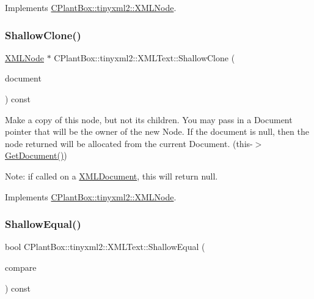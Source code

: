 Implements \hyperlink{classCPlantBox_1_1tinyxml2_1_1XMLNode_a2cdc6f044bd1f971e211328e42a4f9d5}{C\+Plant\+Box\+::tinyxml2\+::\+X\+M\+L\+Node}.

\mbox{\label{classCPlantBox_1_1tinyxml2_1_1XMLText_ac0dd7bbd05ed931505a5f214ee7c1fe8}} 
\subsubsection{\texorpdfstring{Shallow\+Clone()}{ShallowClone()}}
{\footnotesize\ttfamily \hyperlink{classCPlantBox_1_1tinyxml2_1_1XMLNode}{X\+M\+L\+Node} $\ast$ C\+Plant\+Box\+::tinyxml2\+::\+X\+M\+L\+Text\+::\+Shallow\+Clone (\begin{DoxyParamCaption}\item[{\hyperlink{classCPlantBox_1_1tinyxml2_1_1XMLDocument}{X\+M\+L\+Document} $\ast$}]{document }\end{DoxyParamCaption}) const\hspace{0.3cm}{\ttfamily [virtual]}}

Make a copy of this node, but not its children. You may pass in a Document pointer that will be the owner of the new Node. If the \textquotesingle{}document\textquotesingle{} is null, then the node returned will be allocated from the current Document. (this-\/$>$\hyperlink{classCPlantBox_1_1tinyxml2_1_1XMLNode_ac0d1a9be320497a51e7a202881a2352e}{Get\+Document()})

Note\+: if called on a \hyperlink{classCPlantBox_1_1tinyxml2_1_1XMLDocument}{X\+M\+L\+Document}, this will return null. 

Implements \hyperlink{classCPlantBox_1_1tinyxml2_1_1XMLNode_a8439e4e87206b26bc03427ffac3e882a}{C\+Plant\+Box\+::tinyxml2\+::\+X\+M\+L\+Node}.

\mbox{\label{classCPlantBox_1_1tinyxml2_1_1XMLText_afd134659ffccdf5a10d88e63cf0009fd}} 
\subsubsection{\texorpdfstring{Shallow\+Equal()}{ShallowEqual()}}
{\footnotesize\ttfamily bool C\+Plant\+Box\+::tinyxml2\+::\+X\+M\+L\+Text\+::\+Shallow\+Equal (\begin{DoxyParamCaption}\item[{const \hyperlink{classCPlantBox_1_1tinyxml2_1_1XMLNode}{X\+M\+L\+Node} $\ast$}]{compare }\end{DoxyParamCaption}) const\hspace{0.3cm}{\ttfamily [virtual]}}

